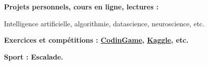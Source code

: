 \textbf{Projets personnels, cours en ligne, lectures :}

Intelligence artificielle, algorithmie, datascience, neuroscience, etc.

\medskip

\textbf{Exercices et comp\'etitions : \href{https://www.codingame.com}{CodinGame}, \href{https://www.kaggle.com/}{Kaggle}, etc.}

\medskip

\textbf{Sport : Escalade.}
